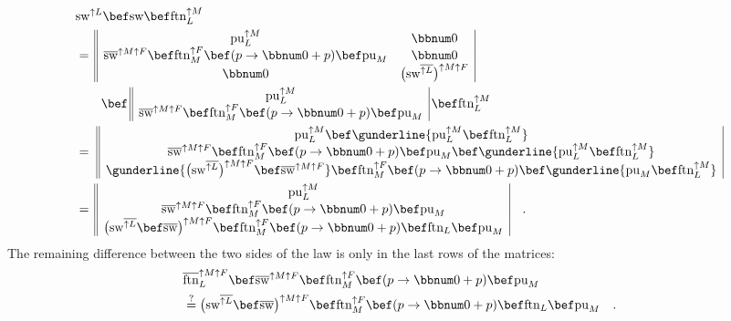 \begin{align*}
 & \text{sw}^{\uparrow L}\bef\text{sw}\bef\text{ftn}_{L}^{\uparrow M}\\
 & =\,\begin{array}{||cc|}
\text{pu}_{L}^{\uparrow M} & \bbnum 0\\
\overline{\text{sw}}^{\uparrow M\uparrow F}\bef\text{ftn}_{M}^{\uparrow F}\bef(p\rightarrow\bbnum 0+p)\bef\text{pu}_{M} & \bbnum 0\\
\bbnum 0 & \big(\text{sw}^{\overline{\uparrow L}}\big)^{\uparrow M\uparrow F}
\end{array}\\
 & \quad\quad\bef\,\begin{array}{||c|}
\text{pu}_{L}^{\uparrow M}\\
\overline{\text{sw}}^{\uparrow M\uparrow F}\bef\text{ftn}_{M}^{\uparrow F}\bef(p\rightarrow\bbnum 0+p)\bef\text{pu}_{M}
\end{array}\,\bef\text{ftn}_{L}^{\uparrow M}\\
 & =\,\,\begin{array}{||c|}
\text{pu}_{L}^{\uparrow M}\bef\gunderline{\text{pu}_{L}^{\uparrow M}\bef\text{ftn}_{L}^{\uparrow M}}\\
\overline{\text{sw}}^{\uparrow M\uparrow F}\bef\text{ftn}_{M}^{\uparrow F}\bef(p\rightarrow\bbnum 0+p)\bef\text{pu}_{M}\bef\gunderline{\text{pu}_{L}^{\uparrow M}\bef\text{ftn}_{L}^{\uparrow M}}\\
\gunderline{\big(\text{sw}^{\overline{\uparrow L}}\big)^{\uparrow M\uparrow F}\bef\overline{\text{sw}}^{\uparrow M\uparrow F}}\bef\text{ftn}_{M}^{\uparrow F}\bef(p\rightarrow\bbnum 0+p)\bef\gunderline{\text{pu}_{M}\bef\text{ftn}_{L}^{\uparrow M}}
\end{array}\\
 & =\,\begin{array}{||c|}
\text{pu}_{L}^{\uparrow M}\\
\overline{\text{sw}}^{\uparrow M\uparrow F}\bef\text{ftn}_{M}^{\uparrow F}\bef(p\rightarrow\bbnum 0+p)\bef\text{pu}_{M}\\
\big(\text{sw}^{\overline{\uparrow L}}\bef\overline{\text{sw}}\big)^{\uparrow M\uparrow F}\bef\text{ftn}_{M}^{\uparrow F}\bef(p\rightarrow\bbnum 0+p)\bef\text{ftn}_{L}\bef\text{pu}_{M}
\end{array}\quad.
\end{align*}
The remaining difference between the two sides of the law is only
in the last rows of the matrices:
\begin{align*}
 & \overline{\text{ftn}}_{L}^{\uparrow M\uparrow F}\bef\overline{\text{sw}}^{\uparrow M\uparrow F}\bef\text{ftn}_{M}^{\uparrow F}\bef(p\rightarrow\bbnum 0+p)\bef\text{pu}_{M}\\
 & \overset{?}{=}\big(\text{sw}^{\overline{\uparrow L}}\bef\overline{\text{sw}}\big)^{\uparrow M\uparrow F}\bef\text{ftn}_{M}^{\uparrow F}\bef(p\rightarrow\bbnum 0+p)\bef\text{ftn}_{L}\bef\text{pu}_{M}\quad.
\end{align*}
